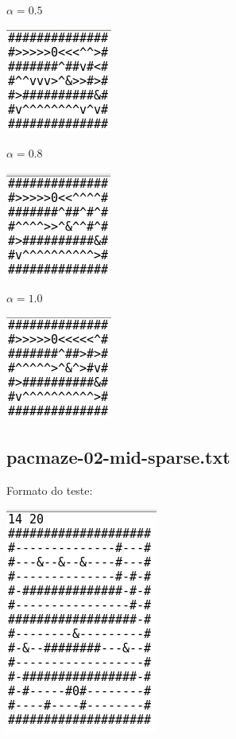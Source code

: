 \documentclass[11pt]{article}
\begin{document}
$\alpha = 0.5$

\includegraphics[scale=.5]{tst1-05.png}

$\alpha = 0.8$

\includegraphics[scale=.5]{tst1-08.png}

$\alpha = 1.0$

\includegraphics[scale=.5]{tst1-10.png}

\subsection{pacmaze-02-mid-sparse.txt}

Formato do teste:

\includegraphics[scale=.5]{tst2-map.png}
\end{document}
